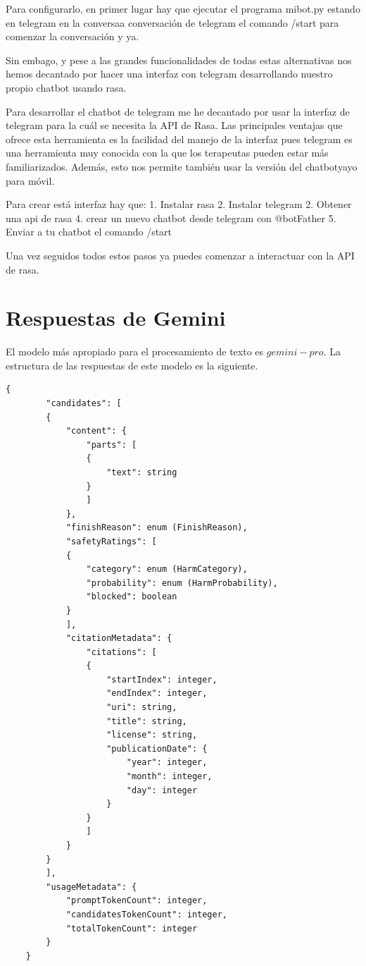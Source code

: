 Para configurarlo, en primer lugar hay que ejecutar el programa mibot.py estando en telegram en la conversaa conversación de telegram el comando /start para comenzar la conversación y ya. 

Sin embago, y pese a las grandes funcionalidades de todas estas alternativas nos hemos decantado por hacer una interfaz con telegram desarrollando nuestro propio chatbot usando rasa. 

Para desarrollar el chatbot de telegram me he decantado por usar la interfaz de telegram para la cuál se necesita la API de Rasa. Las principales ventajas que ofrece esta herramienta es la facilidad del manejo de la interfaz pues telegram es una herramienta muy conocida con la que los terapeutas pueden estar más familiarizados. Además, esto nos permite también usar la versión del chatbotyayo para móvil. 

Para crear está interfaz hay que: 
1. Instalar rasa
2. Instalar telegram 
2. Obtener una api de rasa
4. crear un nuevo chatbot desde telegram con @botFather
5. Enviar a tu chatbot el comando /start

Una vez seguidos todos estos pasos ya puedes comenzar a interactuar con la API de rasa. 


\section{Respuestas de Gemini}

El modelo más apropiado para el procesamiento de texto es $gemini-pro$. La estructura de las respuestas de este modelo es la siguiente. 

\begin{lstlisting}[style=SpyderStyle, caption={Estructura de una respuesta de Gemini}, captionpos=b, label={lst:python},breaklines = true]
	{
		"candidates": [
		{
			"content": {
				"parts": [
				{
					"text": string
				}
				]
			},
			"finishReason": enum (FinishReason),
			"safetyRatings": [
			{
				"category": enum (HarmCategory),
				"probability": enum (HarmProbability),
				"blocked": boolean
			}
			],
			"citationMetadata": {
				"citations": [
				{
					"startIndex": integer,
					"endIndex": integer,
					"uri": string,
					"title": string,
					"license": string,
					"publicationDate": {
						"year": integer,
						"month": integer,
						"day": integer
					}
				}
				]
			}
		}
		],
		"usageMetadata": {
			"promptTokenCount": integer,
			"candidatesTokenCount": integer,
			"totalTokenCount": integer
		}
	}
\end{lstlisting}

